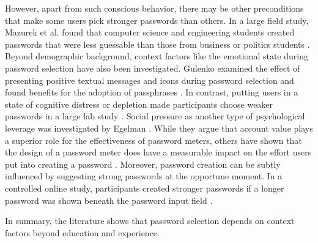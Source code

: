 However, apart from such conscious behavior, there may be other preconditions that make some users pick stronger passwords than others. In a large field study, Mazurek et al. found that computer science and engineering students created passwords that were less guessable than those from business or politics students \cite{Mazurek2013Measuring}. Beyond demographic background, context factors like the emotional state during password selection have also been investigated. Gulenko examined the effect of presenting positive textual messages and icons during password selection and found benefits for the adoption of passphrases \cite{Gulenko2014PasswordsEmotion}. In contrast, putting users in a state of cognitive distress or depletion made participants choose weaker passwords in a large lab study \cite{Gross2016EffectCognitiveEffort}. Social pressure as another type of psychological leverage was investigated by Egelman \etal \cite{Egelman2013DoesMyPasswordGoUpToEleven}. While they argue that account value plays a superior role for the effectiveness of password meters, others have shown that the design of a password meter does have a measurable impact on the effort users put into creating a password \cite{Ur2012HowDoesYourPasswordMeasureUp}. Moreover, password creation can be subtly influenced by suggesting strong passwords at the opportune moment. In a controlled online study, participants created stronger passwords if a longer password was shown beneath the password input field \cite{Seitz2016SuggestionsDecoy}. 

In summary, the literature shows that password selection depends on context factors beyond education and experience. 
